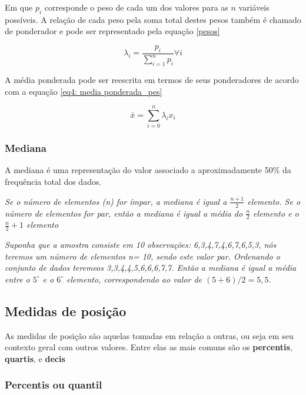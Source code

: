Em que $p_{i}$ corresponde o peso de cada um dos valores para as $n$ variáveis possíveis. A relação de cada peso pela soma total destes pesos também é chamado de ponderador e pode ser representado pela equação \eqref{pesos}

\begin{equation}\label{pesos}
\lambda_i = \frac{p_i}{\sum_{i=1}^{n}p_i} \forall i 
\end{equation}

A média ponderada pode ser reescrita em termos de seus ponderadores de acordo com a equação \eqref{eq4: media ponderada_pes}

\begin{equation}\label{eq4: media ponderada_pes}
\bar{x} =  \sum_{i = 0}^{n} \lambda_{i} x_{i} 
\end{equation}

\subsubsection{Mediana} 

A mediana é uma representação do valor associado a aproximadamente 50\% da frequência total dos dados. 

\begin{definition}[Mediana]
\textit{Se o número de elementos (n) for ímpar, a mediana é igual a $\frac{n+1}{2}$ elemento. Se o número de elementos for par, então a mediana é igual a média do $\frac{n}{2}$ elemento e o $\frac{n}{2}+1$ elemento} 
\end{definition}

\begin{proposition}
\textit{Suponha que a amostra consiste em 10 observações: 6,3,4,7,4,6,7,6,5,3, nós teremos um número de elementos n= 10, sendo este valor par. Ordenando o conjunto de dados teremeos 3,3,4,4,5,6,6,6,7,7. Então a mediana é igual a média entre o $5^{\circ}$ e o $6^{\circ}$ elemento, correspondendo ao valor de $(5+6)/2=5,5$.}
\end{proposition}

\subsection{Medidas de posição}

As medidas de posição são aquelas tomadas em relação a outras, ou seja em seu contexto geral com outros valores. Entre elas as mais comuns são os \textbf{percentis}, \textbf{quartis}, e \textbf{decis} 

\subsubsection{Percentis ou quantil} 

